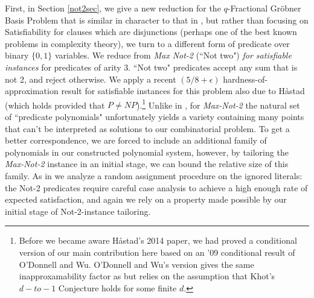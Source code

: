 \documentclass{article}
\begin{document}
First, in Section \ref{not2sec}, we give a
new reduction for the $q$-Fractional Gr\"{o}bner Basis Problem  that is similar in character to that in \citep{RS}, but rather than focusing on Satisfiability for clauses which are disjunctions
(perhaps one of the best known problems in complexity theory),
we turn to a different form of predicate over binary $\{0,1\}$ variables. We reduce from \textit{Max Not-2} (``Not two") \textit{for satisfiable instances} for predicates of arity 3. ``Not two" predicates accept any sum that is not 2, and reject otherwise. We apply a recent $(5/8+\epsilon)$ hardness-of-approximation result for satisfiable instances for this problem also due to H{\aa}stad (which holds
provided that $P\neq NP$).\footnote{Before we became aware H{\aa}stad's 2014 paper, we had proved a conditional version of our main contribution here based on an '09 conditional result of O'Donnell and Wu.  O'Donnell and Wu's version gives the same inapproxamability factor as \citep{hast14} but relies on the assumption that Khot's $d-to-1$ Conjecture holds for some finite $d$.}
Unlike in \citep{RS}, for \textit{Max-Not-2} the natural set of ``predicate polynomials" unfortunately yields a variety containing many points that can't be interpreted as solutions to our combinatorial problem. To get a better correspondence, we are forced to include an additional family of polynomials in our constructed polynomial system, however, by tailoring the \textit{Max-Not-2} instance in an initial stage, we can bound the relative size of this family. As in \citep{RS} we analyze a random assignment procedure on the ignored literals: the Not-2 predicates require careful case analysis to achieve a high enough rate of expected satisfaction, and again we rely on a property made possible by our initial stage of Not-2-instance tailoring. 
\end{document}
